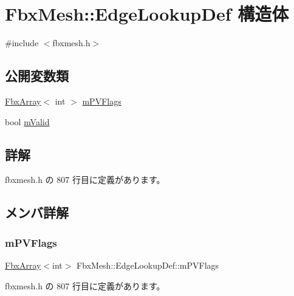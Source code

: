 \hypertarget{struct_fbx_mesh_1_1_edge_lookup_def}{}\section{Fbx\+Mesh\+:\+:Edge\+Lookup\+Def 構造体}
\label{struct_fbx_mesh_1_1_edge_lookup_def}


{\ttfamily \#include $<$fbxmesh.\+h$>$}

\subsection*{公開変数類}
\begin{DoxyCompactItemize}
\item 
\hyperlink{class_fbx_array}{Fbx\+Array}$<$ int $>$ \hyperlink{struct_fbx_mesh_1_1_edge_lookup_def_a9be52d962a2655941193eb55bdb7aafc}{m\+P\+V\+Flags}
\item 
bool \hyperlink{struct_fbx_mesh_1_1_edge_lookup_def_a9845197a148e934eceda317c95965a68}{m\+Valid}
\end{DoxyCompactItemize}


\subsection{詳解}


 fbxmesh.\+h の 807 行目に定義があります。



\subsection{メンバ詳解}
\mbox{\label{struct_fbx_mesh_1_1_edge_lookup_def_a9be52d962a2655941193eb55bdb7aafc}} 
\subsubsection{\texorpdfstring{m\+P\+V\+Flags}{mPVFlags}}
{\footnotesize\ttfamily \hyperlink{class_fbx_array}{Fbx\+Array}$<$int$>$ Fbx\+Mesh\+::\+Edge\+Lookup\+Def\+::m\+P\+V\+Flags}



 fbxmesh.\+h の 807 行目に定義があります。

